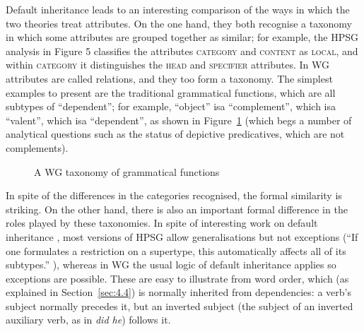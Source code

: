 \documentclass[output=paper]{langscibook}
\begin{document}
Default inheritance leads to an interesting comparison of the ways in which the two theories treat attributes. On the one hand, they both recognise a taxonomy in which some attributes are grouped together as similar; for example, the HPSG analysis in Figure 5 classifies the attributes \textsc{category} and \textsc{content} as \textsc{local}, and within \textsc{category} it distinguishes the \textsc{head} and \textsc{specifier} attributes. In WG attributes are called relations, and they too form a taxonomy. The simplest examples to present are the traditional grammatical functions, which are all subtypes of ``dependent''; for example, ``object'' isa ``complement'', which isa ``valent'', which isa ``dependent'', as shown in Figure~\ref{fig:8} (which begs a number of analytical questions such as the status of depictive predicatives, which are not complements).

\begin{figure}
	\centering
{}
	\caption{A WG taxonomy of grammatical functions}
	\label{fig:8}
\end{figure}

In spite of the differences in the categories recognised, the formal similarity is striking. On the other hand, there is also an important formal difference in the roles played by these taxonomies. In spite of interesting work on default inheritance \citep{LC99a}, most versions of HPSG allow generalisations but not exceptions (``If one formulates a restriction on a supertype, this automatically affects all of its subtypes.'' \citep[275]{MuellerGT-Eng2}), whereas in WG the usual logic of default inheritance applies so exceptions are possible. These are easy to illustrate from word order, which (as explained in Section~\ref{sec:4.4}) is normally inherited from dependencies: a verb’s subject normally precedes it, but an inverted subject (the subject of an inverted auxiliary verb, as in \emph{did he}) follows it.
\end{document}
